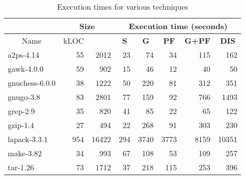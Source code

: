 \begin{table}[!htb]\centering
      \begin{tabular}{|l|r|r|r|r|r|r|r|} \hline
        \multicolumn{1}{|c|}{} &
        \multicolumn{2}{c|}{Size} &
        \multicolumn{5}{c|}{Execution time (seconds)} \\ \hline
        \multicolumn{1}{|c|}{Name} & 
        \multicolumn{1}{c|}{kLOC}  & 
        \multicolumn{1}{c|}{}  &
        \multicolumn{1}{c|}{\textbf{S}} &
        \multicolumn{1}{c|}{\textbf{G}} &
        \multicolumn{1}{c|}{\textbf{PF}} &
        \multicolumn{1}{c|}{\textbf{G+PF}} &
	\multicolumn{1}{c|}{\textbf{DIS}} \\ 
        \hline
a2ps-4.14       &  55   &  2012   & 23 & 74 & 34 & 115 & 162 \\    
gawk-4.0.0      &  59   &  902    & 15 & 46 & 12 & 40 & 50 \\      
gnuchess-6.0.0  &  38   &  1222   & 50 & 220 & 81 & 312 & 351 \\   
gnugo-3.8       &  83   &  2801   & 77 & 159 & 92 & 766 & 1493 \\  
grep-2.9        &  35   &  820    & 41 & 85 & 22 & 65 & 122 \\     
gzip-1.4        &  27   &  494    & 22 & 268 & 91 & 303 & 230 \\   
lapack-3.3.1    &  954  &  16422  & 294 & 3740 & 3773 & 8159 & 10351 \\
make-3.82       &  34   &  993    & 67 & 108 & 53 & 109 & 257 \\   
tar-1.26        &  73   &  1712   & 37 & 218 & 115 & 253 & 396 \\  
 	\hline
      \end{tabular}
\caption{Execution times for various techniques}
\label{tab:time}
\end{table}

